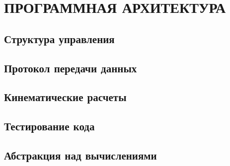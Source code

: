 \chapter{\MakeUppercase{Программная архитектура}}
\section{Структура управления}

\section{Протокол передачи данных}

\section{Кинематические расчеты}

\section{Тестирование кода}

\section{Абстракция над вычислениями}
